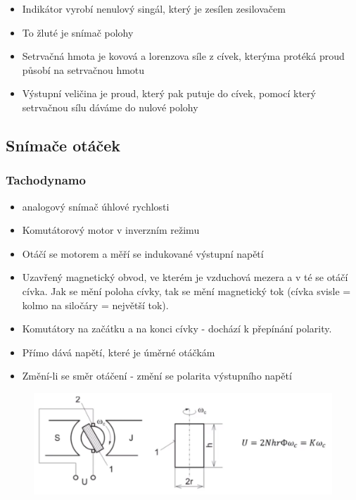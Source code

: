\begin{itemize}
    \item Indikátor vyrobí nenulový singál, který je zesílen zesilovačem
    \item To žluté je snímač polohy
    \item Setrvačná hmota je kovová a lorenzova síle z cívek, kterýma protéká proud působí na setrvačnou hmotu
    \item Výstupní veličina je proud, který pak putuje do cívek, pomocí který setrvačnou sílu dáváme do nulové polohy
\end{itemize}

\subsection*{Snímače otáček}
\subsubsection*{Tachodynamo}
\begin{itemize}
    \item analogový snímač úhlové rychlosti
    \item Komutátorový motor v inverzním režimu
    \item Otáčí se motorem a měří se indukované výstupní napětí
    \item Uzavřený magnetický obvod, ve kterém je vzduchová mezera a v té se otáčí cívka. Jak se mění poloha cívky, tak se mění magnetický tok (cívka svisle = kolmo na siločáry = největší tok).
    \item Komutátory na začátku a na konci cívky - dochází k přepínání polarity.
    \item Přímo dává napětí, které je úměrné otáčkám
    \item Změní-li se směr otáčení - změní se polarita výstupního napětí
\end{itemize}

\begin{figure}[h]
    \centering
    \includegraphics[scale = 0.50]{img/TachoRYCH.png}
\end{figure}


